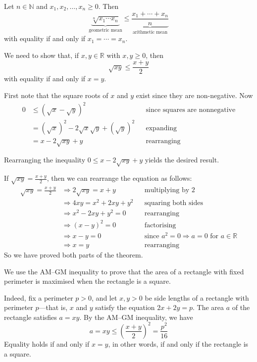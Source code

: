 \begin{theorem}
\label{thmAMGMInequality}
Let $n \in \mathbb{N}$ and $x_1,x_2,\dots,x_n \ge 0$. Then
\[ \underbrace{\sqrt[n]{x_1 \cdots x_n}}_{\text{geometric mean}} \le \underbrace{\frac{x_1 + \cdots + x_n}{n}}_{\text{arithmetic mean}} \]
with equality if and only if $x_1 = \cdots = x_n$.
\end{theorem}
\begin{cproof}[when $n=2$]
We need to show that, if $x,y \in \mathbb{R}$ with $x, y \ge 0$, then
\[ \sqrt{xy} \le \frac{x+y}{2} \]
with equality if and only if $x=y$.

First note that the square roots of $x$ and $y$ exist since they are non-negative. Now
\begin{align*}
0 &\le (\sqrt{x}-\sqrt{y})^2 && \text{since squares are nonnegative} \\
&= (\sqrt{x})^2 - 2\sqrt{x}\sqrt{y} + (\sqrt{y})^2 && \text{expanding} \\
&= x - 2\sqrt{xy} + y && \text{rearranging}
\end{align*}

Rearranging the inequality $0 \le x-2\sqrt{xy}+y$ yields the desired result.

If $\sqrt{xy} = \frac{x+y}{2}$, then we can rearrange the equation as follows:
\begin{align*}
\sqrt{xy} = \frac{x+y}{2} &\Rightarrow 2\sqrt{xy} = x+y && \text{multiplying by $2$} \\
&\Rightarrow 4xy = x^2+2xy+y^2 && \text{squaring both sides} \\
&\Rightarrow x^2-2xy+y^2 = 0 && \text{rearranging} \\
&\Rightarrow (x-y)^2 = 0 && \text{factorising} \\
&\Rightarrow x-y = 0 && \text{since $a^2=0 \Rightarrow a=0$ for $a \in \mathbb{R}$} \\
&\Rightarrow x=y && \text{rearranging}
\end{align*}
So we have proved both parts of the theorem.
\end{cproof}

\begin{example}
We use the AM--GM inequality to prove that the area of a rectangle with fixed perimeter is maximised when the rectangle is a square.

Indeed, fix a perimeter $p > 0$, and let $x,y > 0$ be side lengths of a rectangle with perimeter $p$---that is, $x$ and $y$ satisfy the equation $2x+2y=p$. The area $a$ of the rectangle satisfies $a=xy$. By the AM--GM inequality, we have
\[ a = xy \le \left( \frac{x+y}{2} \right)^2 = \frac{p^2}{16} \]
Equality holds if and only if $x=y$, in other words, if and only if the rectangle is a square.
\end{example}

